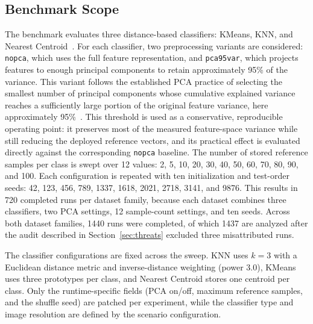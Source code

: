 \documentclass[sigconf,review,nonacm]{acmart}
\begin{document}
\subsection{Benchmark Scope}
\label{sec:scope}
The benchmark evaluates three distance-based classifiers: KMeans, KNN, and Nearest Centroid~\cite{cover1967nearest,kanungo2002efficient,calafiore2019sparse}.
For each classifier, two preprocessing variants are considered: \texttt{nopca}, which uses the full feature representation, and \texttt{pca95var}, which projects features to enough principal components to retain approximately 95\% of the variance.
This variant follows the established PCA practice of selecting the smallest number of principal components whose cumulative explained variance reaches a sufficiently large portion of the original feature variance, here approximately 95\%~\cite{geron2019handson}.
This threshold is used as a conservative, reproducible operating point: it preserves most of the measured feature-space variance while still reducing the deployed reference vectors, and its practical effect is evaluated directly against the corresponding \texttt{nopca} baseline.
The number of stored reference samples per class is swept over 12 values: 2, 5, 10, 20, 30, 40, 50, 60, 70, 80, 90, and 100.
Each configuration is repeated with ten initialization and test-order seeds: 42, 123, 456, 789, 1337, 1618, 2021, 2718, 3141, and 9876.
This results in 720 completed runs per dataset family, because each dataset combines three classifiers, two PCA settings, 12 sample-count settings, and ten seeds. Across both dataset families, 1440 runs were completed, of which 1437 are analyzed after the audit described in Section~\ref{sec:threats} excluded three misattributed runs.

The classifier configurations are fixed across the sweep.
KNN uses $k=3$ with a Euclidean distance metric and inverse-distance weighting (power 3.0), KMeans uses three prototypes per class, and Nearest Centroid stores one centroid per class.
Only the runtime-specific fields (PCA on/off, maximum reference samples, and the shuffle seed) are patched per experiment, while the classifier type and image resolution are defined by the scenario configuration.
\end{document}
